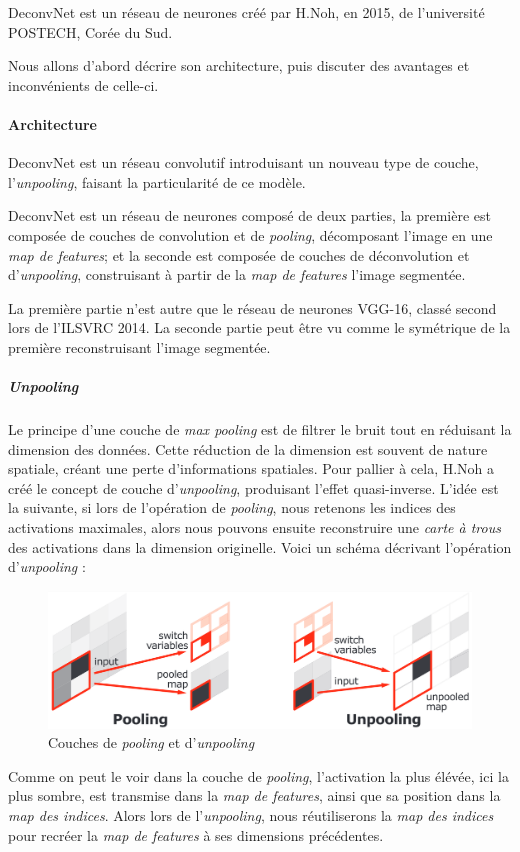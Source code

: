 \documentclass[a4paper, 11pt]{report}
\begin{document}
DeconvNet est un réseau de neurones créé par H.Noh, en 2015, de l'université POSTECH, Corée du Sud.

Nous allons d'abord décrire son architecture, puis discuter des avantages et inconvénients de celle-ci.

\paragraph{Architecture}
DeconvNet est un réseau convolutif introduisant un nouveau type de couche, l'\emph{unpooling}, faisant la particularité de ce modèle.

DeconvNet est un réseau de neurones composé de deux parties, la première est composée de couches de convolution et de \emph{pooling}, décomposant l'image en une \emph{map de features}; et la seconde est composée de couches de déconvolution et d'\emph{unpooling}, construisant à partir de la \emph{map de features} l'image segmentée.

La première partie n'est autre que le réseau de neurones VGG-16, classé second lors de l'ILSVRC 2014.
La seconde partie peut être vu comme le symétrique de la première reconstruisant l'image segmentée.

\subparagraph{Unpooling}
Le principe d'une couche de \emph{max pooling} est de filtrer le bruit tout en réduisant la dimension des données. Cette réduction de la dimension est souvent de nature spatiale, créant une perte d'informations spatiales.
Pour pallier à cela, H.Noh a créé le concept de couche d'\emph{unpooling}, produisant l'effet quasi-inverse.
L'idée est la suivante, si lors de l'opération de \emph{pooling}, nous retenons les indices des activations maximales, alors nous pouvons ensuite reconstruire une \emph{carte à trous} des activations dans la dimension originelle.
Voici un schéma décrivant l'opération d'\emph{unpooling} :
\begin{figure}[H]
	\begin{center}
		\includegraphics[scale=0.3]{Images/Unpooling.png}
		\caption{Couches de \emph{pooling} et d'\emph{unpooling}}
	\end{center}
\end{figure}
Comme on peut le voir dans la couche de \emph{pooling}, l'activation la plus élévée, ici la plus sombre, est transmise dans la \emph{map de features}, ainsi que sa position dans la \emph{map des indices}. Alors lors de l'\emph{unpooling}, nous réutiliserons la \emph{map des indices} pour recréer la \emph{map de features} à ses dimensions précédentes.
\end{document}
